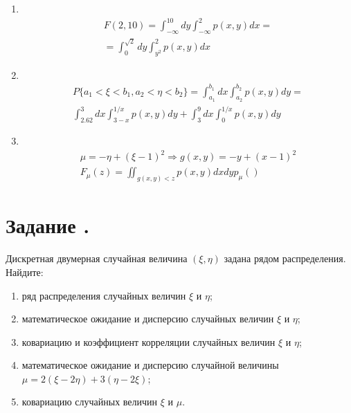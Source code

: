 \documentclass[12pt]{article}
\begin{document}
\begin{enumerate}
	\item \mbox{}\\
	      \begin{gather*}
		      F(2,10) = \int_{-\infty}^{10}dy\int_{-\infty}^{2}p(x, y)dx = \\
		      = \int_{0}^{\sqrt{2}}dy\int_{y^2}^{2}p(x, y)dx
	      \end{gather*}

	\item \mbox{}\\
	      \begin{gather*}
		      P\{a_1 < \xi < b_1, a_2 < \eta < b_2\} = \int_{a_1}^{b_1}dx\int_{a_2}^{b_2}p(x, y)dy = \\
		      \int_{2.62}^{3}dx\int_{3 - x}^{1/{x}}p(x, y)dy +
		      \int_{3}^{9}dx\int_{0}^{1/{x}}p(x, y)dy
	      \end{gather*}

	\item \mbox{}\\
	      \begin{gather*}
		      \mu = -\eta + (\xi - 1)^2 \Rightarrow g(x, y) = -y + (x - 1)^2 \\
		      F_{\mu}(z) = \iint_{g(x, y) < z} p(x,y)dxdy
		      p_{\mu}()
	      \end{gather*}

\end{enumerate}

\section*{Задание .}

Дискретная двумерная случайная величина $(\xi, \eta)$ задана рядом распределения.
Найдите:

\begin{enumerate}
	\item ряд распределения случайных величин $\xi$ и $\eta$;
	\item математическое ожидание и дисперсию случайных величин $\xi$ и $\eta$;
	\item ковариацию и коэффициент корреляции случайных величин $\xi$ и $\eta$;
	\item математическое ожидание и дисперсию случайной величины $\mu = 2(\xi - 2\eta) + 3(\eta - 2\xi)$;
	\item ковариацию случайных величин $\xi$ и $\mu$.
\end{enumerate}
\end{document}
